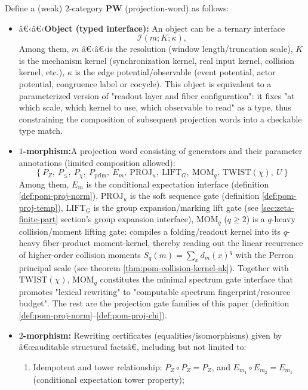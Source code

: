 \begin{definition}\label{def:pom-projword-2cat}
Define a (weak) $2$-category $\mathbf{PW}$ (projection-word) as follows:
\begin{itemize}
  \item â€‹â€‹\textbf{Object (typed interface):} An object can be a ternary interface
  \[
  \mathcal{I}(m;K;\kappa),
  \]
  Among them, $m$ â€‹â€‹is the resolution (window length/truncation scale), $K$ is the mechanism kernel (synchronization kernel, real input kernel, collision kernel, etc.), $\kappa$ is the edge potential/observable (event potential, actor potential, congruence label or cocycle). This object is equivalent to a parameterized version of "readout layer and fiber configuration": it fixes "at which scale, which kernel to use, which observable to read" as a type, thus constraining the composition of subsequent projection words into a checkable type match.
  \item \textbf{$1$-morphism:}A projection word consisting of generators and their parameter annotations (limited composition allowed):
  \[
  \{\ P_Z,\ P_{\le},\ P_\chi,\ P_{\mathrm{prim}},\ E_m,\ \mathrm{PROJ}_u,\ \mathrm{LIFT}_G,\ \mathrm{MOM}_q,\ \mathrm{TWIST}(\chi),\ U\ \}
  \]
  Among them, $E_m$ is the conditional expectation interface (definition \ref{def:pom-proj-norm}), $\mathrm{PROJ}_u$ is the soft sequence gate (definition \ref{def:pom-proj-temp}), $\mathrm{LIFT}_G$ is the group expansion/marking lift gate (see \ref{sec:zeta-finite-part} section's group expansion interface), $\mathrm{MOM}_q$ ($q\ge2$) is a $q$-heavy collision/moment lifting gate: compiles a folding/readout kernel into its $q$-heavy fiber-product moment-kernel, thereby reading out the linear recurrence of higher-order collision moments \(S_q(m)=\sum_x d_m(x)^q\) with the Perron principal scale (see theorem \ref{thm:pom-collision-kernel-ak}). Together with \(\mathrm{TWIST}(\chi)\), \(\mathrm{MOM}_q\) constitutes the minimal spectrum gate interface that promotes "lexical rewriting" to "computable spectrum fingerprint/resource budget". The rest are the projection gate families of this paper (definition \ref{def:pom-proj-norm}--\ref{def:pom-proj-chi}).
  \item \textbf{$2$-morphism:} Rewriting certificates (equalities/isomorphisms) given by â€œauditable structural factsâ€, including but not limited to:
  \begin{enumerate}
    \item Idempotent and tower relationship: $P_Z\circ P_Z=P_Z$, and $E_{m_1}\circ E_{m_2}=E_{m_1}$ (conditional expectation tower property);

\end{enumerate}
\end{itemize}
\end{definition}
